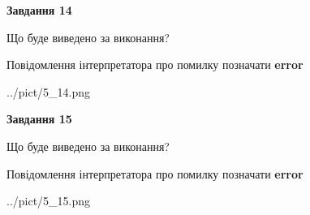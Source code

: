 \documentclass[11pt, ukrainian]{article}
\begin{document}
{\begin {large}
{\begin {center}\textbf{Завдання 14}\end {center}}\par
Що буде виведено за виконання? \par
Повідомлення інтерпретатора про помилку позначати \textbf{error}

\begin{center}
	{../pict/5_14.png}
\end{center}
\newpage

{\begin {center}\textbf{Завдання 15}\end {center}}\par
Що буде виведено за виконання? \par
Повідомлення інтерпретатора про помилку позначати \textbf{error}

\begin{center}
	{../pict/5_15.png}
\end{center}
\newpage

\end {large}}
\end{document}
